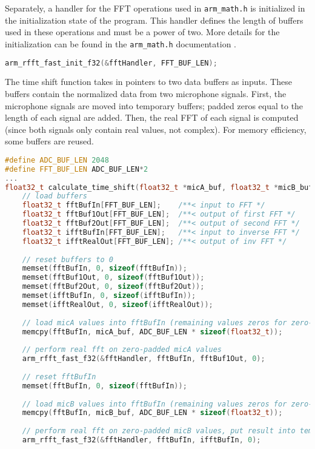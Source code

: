 \documentclass[12pt,a4paper]{report}
\begin{document}
\pagebreak

Separately, a handler for the FFT operations used in \verb|arm_math.h| is initialized in the initialization state of the program. This handler defines the length of buffers used in these operations and must be a power of two. More details for the initialization can be found in the \verb|arm_math.h| documentation \cite{arm}.

\begin{lstlisting}[language=C++]
arm_rfft_fast_init_f32(&fftHandler, FFT_BUF_LEN);
\end{lstlisting}

The time shift function takes in pointers to two data buffers as inputs. These buffers contain the normalized data from two microphone signals. First, the microphone signals are moved into temporary buffers; padded zeros equal to the length of each signal are added. Then, the real FFT of each signal is computed (since both signals only contain real values, not complex). For memory efficiency, some buffers are reused.

\begin{lstlisting}[language=C++]
#define ADC_BUF_LEN 2048
#define FFT_BUF_LEN ADC_BUF_LEN*2
...
float32_t calculate_time_shift(float32_t *micA_buf, float32_t *micB_buf) {
	// load buffers
	float32_t fftBufIn[FFT_BUF_LEN];    /**< input to FFT */
	float32_t fftBuf1Out[FFT_BUF_LEN];  /**< output of first FFT */
	float32_t fftBuf2Out[FFT_BUF_LEN];  /**< output of second FFT */
	float32_t ifftBufIn[FFT_BUF_LEN];   /**< input to inverse FFT */
	float32_t ifftRealOut[FFT_BUF_LEN]; /**< output of inv FFT */
	
	// reset buffers to 0
	memset(fftBufIn, 0, sizeof(fftBufIn));
	memset(fftBuf1Out, 0, sizeof(fftBuf1Out));
	memset(fftBuf2Out, 0, sizeof(fftBuf2Out));
	memset(ifftBufIn, 0, sizeof(ifftBufIn));
	memset(ifftRealOut, 0, sizeof(ifftRealOut));
	
	// load micA values into fftBufIn (remaining values zeros for zero-padding)
	memcpy(fftBufIn, micA_buf, ADC_BUF_LEN * sizeof(float32_t));
	
	// perform real fft on zero-padded micA values
	arm_rfft_fast_f32(&fftHandler, fftBufIn, fftBuf1Out, 0);
	
	// reset fftBufIn
	memset(fftBufIn, 0, sizeof(fftBufIn));
	
	// load micB values into fftBufIn (remaining values zeros for zero-padding)
	memcpy(fftBufIn, micB_buf, ADC_BUF_LEN * sizeof(float32_t));
	
	// perform real fft on zero-padded micB values, put result into temporary buf
	arm_rfft_fast_f32(&fftHandler, fftBufIn, ifftBufIn, 0);
\end{lstlisting}
\end{document}
